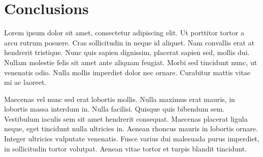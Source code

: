 
\section{Conclusions} %
\label{sec:conclusions}

Lorem ipsum dolor sit amet, consectetur adipiscing elit. Ut porttitor tortor a arcu rutrum posuere. Cras sollicitudin in neque id aliquet. Nam convallis erat at hendrerit tristique. Nunc quis sapien dignissim, placerat sapien sed, mollis dui. Nullam molestie felis sit amet ante aliquam feugiat. Morbi sed tincidunt nunc, ut venenatis odio. Nulla mollis imperdiet dolor nec ornare. Curabitur mattis vitae mi ac laoreet.

Maecenas vel nunc sed erat lobortis mollis. Nulla maximus erat mauris, in lobortis massa interdum in. Nulla facilisi. Quisque quis bibendum sem. Vestibulum iaculis sem sit amet hendrerit consequat. Maecenas placerat ligula neque, eget tincidunt nulla ultricies in. Aenean rhoncus mauris in lobortis ornare. Integer ultricies vulputate venenatis. Fusce varius dui malesuada purus imperdiet, in sollicitudin tortor volutpat. Aenean vitae tortor et turpis blandit tincidunt.

